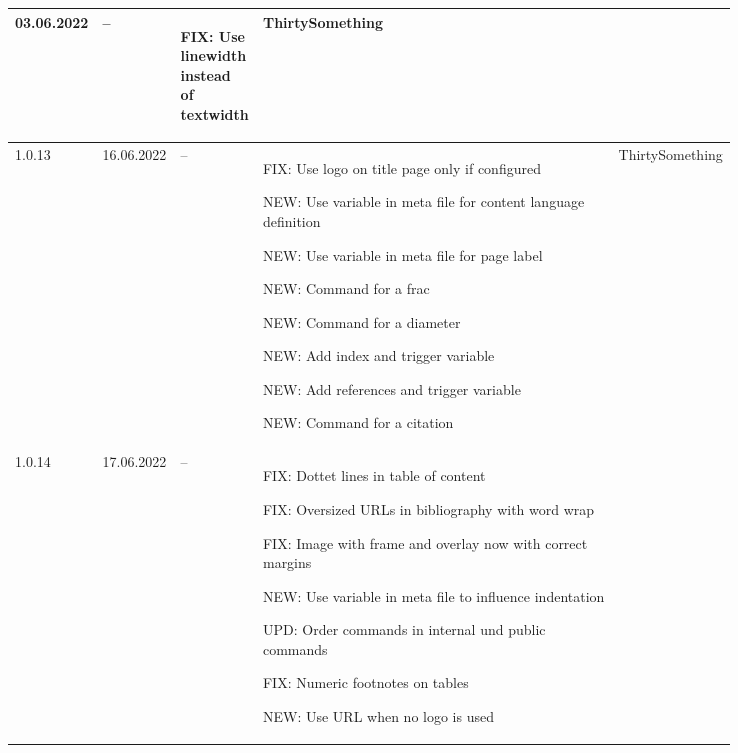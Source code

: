 \begin{tiny}
\begin{longtable}{ | p{0.06\linewidth} | p{0.08\linewidth} | p{0.06\linewidth} | p{0.49\linewidth} | p{0.15\linewidth} | }
        03.06.2022               &
        --                       &
        \begin{tsLTItemize}
            \item FIX: Use linewidth instead of textwidth
        \end{tsLTItemize}
                                 &
        ThirtySomething            \\
        \hline
        1.0.13                   &
        16.06.2022               &
        --                       &
        \begin{tsLTItemize}
            \item FIX: Use logo on title page only if configured
            \item NEW: Use variable in meta file for content language definition
            \item NEW: Use variable in meta file for page label
            \item NEW: Command for a frac
            \item NEW: Command for a diameter
            \item NEW: Add index and trigger variable
            \item NEW: Add references and trigger variable
            \item NEW: Command for a citation
        \end{tsLTItemize}
                                 &
        ThirtySomething            \\
        \hline
        1.0.14                   &
        17.06.2022               &
        --                       &
        \begin{tsLTItemize}
            \item FIX: Dottet lines in table of content
            \item FIX: Oversized URLs in bibliography with word wrap
            \item FIX: Image with frame and overlay now with correct margins
            \item NEW: Use variable in meta file to influence indentation
            \item UPD: Order commands in internal und public commands
            \item FIX: Numeric footnotes on tables
            \item NEW: Use URL when no logo is used

\end{tsLTItemize}
\end{longtable}
\end{tiny}
